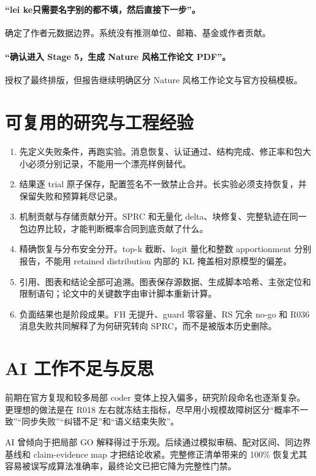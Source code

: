 \documentclass[12pt,a4paper]{article}
\begin{document}
\paragraph{“lei ke只需要名字别的都不填，然后直接下一步”。} 确定了作者元数据边界。系统没有推测单位、邮箱、基金或作者贡献。

\paragraph{“确认进入 Stage 5，生成 Nature 风格工作论文 PDF”。} 授权了最终排版，但报告继续明确区分 Nature 风格工作论文与官方投稿模板。

\section{可复用的研究与工程经验}

\begin{enumerate}[label=\arabic*.]
\item 先定义失败条件，再跑实验。消息恢复、认证通过、结构完成、修正率和包大小必须分别记录，不能用一个漂亮样例替代。
\item 结果逐 trial 原子保存，配置签名不一致禁止合并。长实验必须支持恢复，并保留失败和预算耗尽记录。
\item 机制贡献与存储贡献分开。SPRC 和无量化 delta、块修复、完整轨迹在同一包边界比较，才能判断概率合同到底贡献了什么。
\item 精确恢复与分布安全分开。top-k 截断、logit 量化和整数 apportionment 分别报告，不能用 retained distribution 内部的 KL 掩盖相对原模型的偏差。
\item 引用、图表和结论全部可追溯。图表保存源数据、生成脚本哈希、主张定位和限制语句；论文中的关键数字由审计脚本重新计算。
\item 负面结果也是阶段成果。FH 无提升、guard 零容量、RS 冗余 no-go 和 R036 消息失败共同解释了为何研究转向 SPRC，而不是被版本历史删除。
\end{enumerate}

\section{AI 工作不足与反思}

前期在官方复现和较多局部 coder 变体上投入偏多，研究阶段命名也逐渐复杂。更理想的做法是在 R018 左右就冻结主指标，尽早用小规模故障树区分“概率不一致”“同步失败”“纠错不足”和“语义结束失败”。

AI 曾倾向于把局部 GO 解释得过于乐观。后续通过模拟审稿、配对区间、同边界基线和 claim-evidence map 才把结论收紧。完整修正清单带来的 100\% 恢复尤其容易被误写成算法准确率，最终论文已把它降为完整性门禁。
\end{document}

